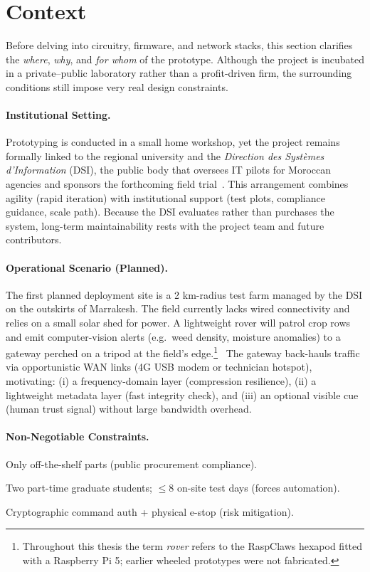\section{Context}
\label{sec:intro:context}

Before delving into circuitry, firmware, and network stacks, this
section clarifies the \emph{where}, \emph{why}, and \emph{for whom} of
the prototype.
Although the project is incubated in a private–public
laboratory rather than a profit-driven firm, the surrounding conditions
still impose very real design constraints.

\paragraph{\textbf{Institutional Setting.}}
Prototyping is conducted in a small home workshop, yet the project
remains formally linked to the regional university and the
\emph{Direction des Systèmes d’Information} (DSI), the public body that
oversees IT pilots for Moroccan agencies and sponsors the forthcoming
field trial~\cite{dsi2025,ministereDSI2024}.
This arrangement combines agility (rapid iteration) with institutional support (test plots, compliance guidance, scale path).
Because the DSI evaluates rather than purchases the system, long-term maintainability rests with the project
team and future contributors.

\paragraph{\textbf{Operational Scenario (Planned).}}
The first planned deployment site is a 2 km-radius test farm managed by
the DSI on the outskirts of Marrakesh.
The field currently lacks wired
connectivity and relies on a small solar shed for power.
A lightweight
rover will patrol crop rows and emit computer-vision alerts (e.g.\ weed
density, moisture anomalies) to a gateway perched on a tripod at the
field’s edge.\footnote{Throughout this thesis the term \emph{rover}
refers to the RaspClaws hexapod fitted with a Raspberry Pi 5; earlier
wheeled prototypes were not fabricated.}%
\ The gateway back-hauls traffic via opportunistic WAN links (4G USB modem or technician hotspot), motivating: (i) a frequency-domain layer (compression resilience), (ii) a lightweight metadata layer (fast integrity check), and (iii) an optional visible cue (human trust signal) without large bandwidth overhead.

\paragraph{\textbf{Non-Negotiable Constraints.}}
\begin{description}[leftmargin=3.2cm,style=sameline]
    \item[\textbf{Budget}] Only off-the-shelf parts (public procurement compliance).
    \item[\textbf{Man-hours}] Two part-time graduate students; $\le 8$ on-site test days (forces automation).
    \item[\textbf{Safety}] Cryptographic command auth + physical e-stop (risk mitigation).
\end{description}

